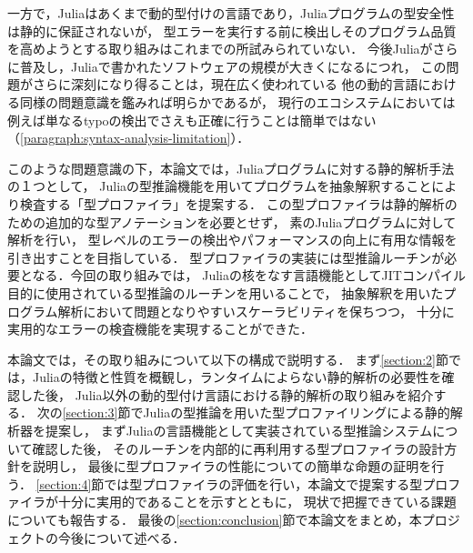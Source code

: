 一方で，Juliaはあくまで動的型付けの言語であり，Juliaプログラムの型安全性は静的に保証されないが，
型エラーを実行する前に検出しそのプログラム品質を高めようとする取り組みはこれまでの所試みられていない．
今後Juliaがさらに普及し，Juliaで書かれたソフトウェアの規模が大きくになるにつれ，
この問題がさらに深刻になり得ることは，現在広く使われている
他の動的言語における同様の問題意識を鑑みれば明らかであるが\cite{ruby-progress-report}，
現行のエコシステムにおいては例えば単なるtypoの検出でさえも正確に行うことは簡単ではない（\ref{paragraph:syntax-analysis-limitation}）．

このような問題意識の下，本論文では，Juliaプログラムに対する静的解析手法の１つとして，
Juliaの型推論機能を用いてプログラムを抽象解釈することにより検査する「型プロファイラ」を提案する．
この型プロファイラは静的解析のための追加的な型アノテーションを必要とせず，
素のJuliaプログラムに対して解析を行い，
型レベルのエラーの検出やパフォーマンスの向上に有用な情報を引き出すことを目指している．
型プロファイラの実装には型推論ルーチンが必要となる．今回の取り組みでは，
Juliaの核をなす言語機能としてJITコンパイル目的に使用されている型推論のルーチンを用いることで，
抽象解釈を用いたプログラム解析において問題となりやすいスケーラビリティを保ちつつ，
十分に実用的なエラーの検査機能を実現することができた．

本論文では，その取り組みについて以下の構成で説明する．
まず\ref{section:2}節では，Juliaの特徴と性質を概観し，ランタイムによらない静的解析の必要性を確認した後，
Julia以外の動的型付け言語における静的解析の取り組みを紹介する．
次の\ref{section:3}節でJuliaの型推論を用いた型プロファイリングによる静的解析器を提案し，
まずJuliaの言語機能として実装されている型推論システムについて確認した後，
そのルーチンを内部的に再利用する型プロファイラの設計方針を説明し，
最後に型プロファイラの性能についての簡単な命題の証明を行う． %
\ref{section:4}節では型プロファイラの評価を行い，本論文で提案する型プロファイラが十分に実用的であることを示すとともに，
現状で把握できている課題についても報告する．
最後の\ref{section:conclusion}節で本論文をまとめ，本プロジェクトの今後について述べる．
